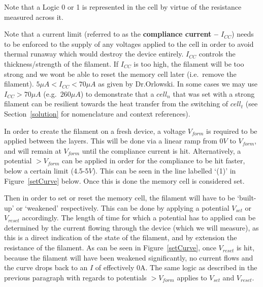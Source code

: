 \documentclass{article}
\begin{document}
          Note that a Logic 0 or 1 is represented in the cell by virtue of the resistance measured across it.

          Note that a current limit (referred to as the \textbf{compliance current -- $I_{CC}$}) needs to be enforced to
          the supply of any voltages applied to the cell in order to avoid thermal runaway which would destroy the
          device entirely. $I_{CC}$ controls the thickness/strength of the filament. If $I_{CC}$ is too high, the
          filament will be too strong and we wont be able to reset the memory cell later (i.e.\ remove the filament).
          $5\mu A < I_{CC} < 70\mu A$ as given by Dr.Orlowski. In some cases we may use $I_{CC} > 70\mu A$ (e.g.\
          $260\mu A$) to demonstrate that a $cell_n$ that was set with a strong filament can be resilient towards the
          heat transfer from the switching of $cell_t$ (see Section~\ref{solution} for nomenclature and context
          references).

          In order to create the filament on a fresh device, a voltage $V_{form}$ is required to be applied between the
          layers. This will be done via a linear ramp from $0V$ to $V_{form}$, and will remain at $V_{form}$ until the
          compliance current is hit. Alternatively, a potential $> V_{form}$ can be applied in order for the compliance
          to be hit faster, below a certain limit (4.5-5$V$). This can be seen in the line labelled `(1)' in
          Figure~\ref{setCurve} below. Once this is done the memory cell is considered set.

          Then in order to set or reset the memory cell, the filament will have to be `built-up' or `weakened'
          respectively. This can be done by applying a potential $V_{set}$ or $V_{reset}$ accordingly. The length of
          time for which a potential has to applied can be determined by the current flowing through the device (which
          we will measure), as this is a direct indication of the state of the filament, and by extension the resistance
          of the filament. As can be seen in Figure~\ref{setCurve}, once $V_{reset}$ is hit, because the filament will
          have been weakened significantly, no current flows and the curve drops back to an $I$ of effectively 0A. The
          same logic as described in the previous paragraph with regards to potentials $> V_{form}$ applies to $V_{set}$
          and $V_{reset}$.
\end{document}
